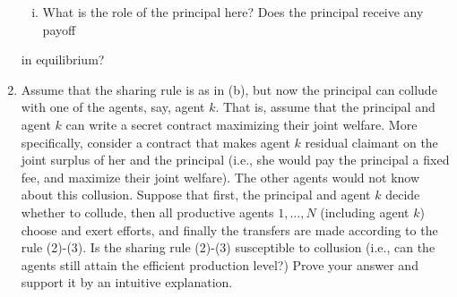 \documentclass[a4paper]{article}
\begin{document}
\begin{enumerate}
\begin{enumerate}[i.]
	\item  What is the role of the principal here? Does the principal receive any payoff
	\end{enumerate}
	in equilibrium?
	\item Assume that the sharing rule is as in (b), but now the principal can collude with
	one of the agents, say, agent $k$. That is, assume that the principal and agent $k$ can
	write a secret contract maximizing their joint welfare. More specifically, consider a
	contract that makes agent $k$ residual claimant on the joint surplus of her and the
	principal (i.e., she would pay the principal a fixed fee, and maximize their joint
	welfare). The other agents would not know about this collusion.
	Suppose that first, the principal and agent $k$ decide whether to collude, then all
	productive agents $1, \dots, N$ (including agent $k$) choose and exert efforts, and finally
	the transfers are made according to the rule (2)-(3).
	Is the sharing rule (2)-(3) susceptible to collusion (i.e., can the agents still attain
	the efficient production level?) Prove your answer and support it by an intuitive explanation.
	\end{enumerate}
\end{document}
